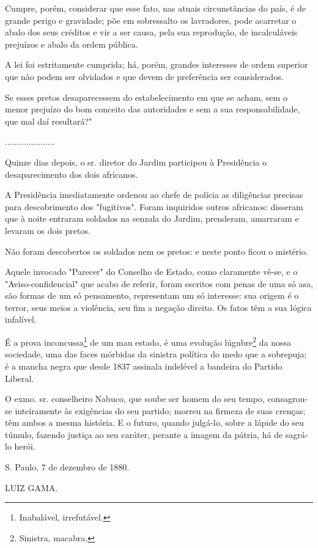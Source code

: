 Cumpre, porém, considerar que esse fato, nas atuais circunstâncias do
país, é de grande perigo e gravidade; põe em sobressalto os lavradores,
pode acarretar o abalo dos seus créditos e vir a ser causa, pela sua
reprodução, de incalculáveis prejuízos e abalo da ordem pública.

A lei foi estritamente cumprida; há, porém, grandes interesses de ordem
superior que não podem ser olvidados e que devem de preferência ser
considerados.

Se esses pretos desaparecessem do estabelecimento em que se acham, sem o
menor prejuízo do bom conceito das autoridades e sem a sua
responsabilidade, que mal daí resultará?"

.....................

Quinze dias depois, o sr. diretor do Jardim participou à Presidência o
desaparecimento dos dois africanos.

A Presidência imediatamente ordenou ao chefe de polícia as diligências
precisas para descobrimento dos "fugitivos". Foram inquiridos outros
africanos: disseram que à noite entraram soldados na senzala do Jardim,
prenderam, amarraram e levaram os dois pretos.

Não foram descobertos os soldados nem os pretos: e neste ponto ficou o
mistério.

Aquele invocado "Parecer" do Conselho de Estado, como claramente vê-se,
e o "Aviso-confidencial" que acabo de referir, foram escritos com penas
de uma só asa, são formas de um só pensamento, representam um só
interesse: sua origem é o terror, seus meios a violência, seu fim a
negação direito. Os fatos têm a sua lógica infalível.

É a prova inconcussa\footnote{Inabalável, irrefutável.} de um mau
estado, é uma evolução lúgubre\footnote{Sinistra, macabra.}
da nossa sociedade, uma das
faces mórbidas da sinistra política do medo que a sobrepuja; é a mancha
negra que desde 1837 assinala indelével a bandeira do Partido Liberal.

O exmo. sr. conselheiro Nabuco, que soube ser homem do seu tempo,
consagrou-se inteiramente às exigências do seu partido; morreu na
firmeza de suas crenças; têm ambos a mesma história. E o futuro, quando
julgá-lo, sobre a lápide do seu túmulo, fazendo justiça ao seu caráter,
perante a imagem da pátria, há de sagrá-lo herói.

S. Paulo, 7 de dezembro de 1880.

LUIZ GAMA.

\pagebreak
\mbox{}\vfill
\thispagestyle{empty}

